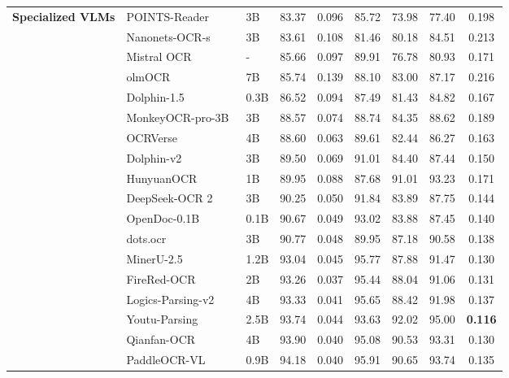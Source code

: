 \documentclass[11pt, a4paper,logo,  copyright, nonumbering]{paddleocr}
\begin{document}
\begin{table}[!t]
{\begin{tabular}{l|ll|c|c c c c c}
        \multirow{21}{*}{\textbf{Specialized VLMs}}
        & POINTS-Reader~\cite{liu2025points} & 3B & 83.37 & 0.096 & 85.72 & 73.98 & 77.40 & 0.198 \\
        & Nanonets-OCR-s~\cite{Nanonets-OCR-S} & 3B & 83.61 & 0.108 & 81.46 & 80.18 & 84.51 & 0.213 \\
        & Mistral OCR~\cite{mistral} & - & 85.66 & 0.097 & 89.91 & 76.78 & 80.93 & 0.171 \\
        & olmOCR~\cite{poznanski2025olmocr} & 7B & 85.74 & 0.139 & 88.10 & 83.00 & 87.17 & 0.216 \\
        & Dolphin-1.5~\cite{feng2025dolphin} & 0.3B & 86.52 & 0.094 & 87.49 & 81.43 & 84.82 & 0.167 \\
        & MonkeyOCR-pro-3B~\cite{li2025monkeyocr} & 3B & 88.57 & 0.074 & 88.74 & 84.35 & 88.62 & 0.189 \\
        & OCRVerse~\cite{zhong2026ocrverseholisticocrendtoend} & 4B & 88.60 & 0.063 & 89.61 & 82.44 & 86.27 & 0.163 \\
        & Dolphin-v2~\cite{feng2025dolphin} & 3B & 89.50 & 0.069 & 91.01 & 84.40 & 87.44 & 0.150 \\
        & HunyuanOCR~\cite{hunyuanvisionteam2025hunyuanocrtechnicalreport} & 1B & 89.95 & 0.088 & 87.68 & 91.01 & 93.23 & 0.171 \\
        & DeepSeek-OCR 2~\cite{wei2025deepseek} & 3B & 90.25 & 0.050 & 91.84 & 83.89 & 87.75 & 0.144 \\
        & OpenDoc-0.1B~\cite{du2025unirec01bunifiedtextformula} & 0.1B & 90.67 & 0.049 & 93.02 & 83.88 & 87.45 & 0.140 \\
        & dots.ocr~\cite{dotsocr} & 3B & 90.77 & 0.048 & 89.95 & 87.18 & 90.58 & 0.138 \\
        & MinerU-2.5~\cite{niu2025mineru2} & 1.2B & 93.04 & 0.045 & 95.77 & 87.88 & 91.47 & 0.130 \\
        & FireRed-OCR~\cite{fireredocr} & 2B & 93.26 & 0.037 & 95.44 & 88.04 & 91.06 & 0.131 \\
        & Logics-Parsing-v2~\cite{LogicsParsing} & 4B & 93.33 & 0.041 & 95.65 & 88.42 & 91.98 & 0.137 \\
        & Youtu-Parsing~\cite{YoutuParsing} & 2.5B & 93.74 & 0.044 & 93.63 & 92.02 & 95.00 & \cellcolor{red!15}\textbf{0.116} \\
        & Qianfan-OCR~\cite{QianfanOCR} & 4B & 93.90 & 0.040 & 95.08 & 90.53 & 93.31 & 0.130 \\
        & PaddleOCR-VL~\cite{cui2025paddleocrvl} & 0.9B & 94.18 & 0.040 & 95.91 & 90.65 & 93.74 & 0.135 \\

\end{tabular}}
\end{table}
\end{document}
